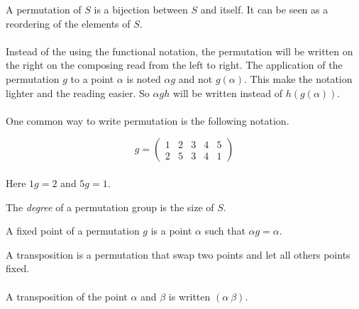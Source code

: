 \begin{definition}[Permutation]
  A permutation of $S$ is a bijection between $S$ and itself. It can be seen as a reordering of the elements of $S$.
\end{definition}

\paragraph{}
Instead of the using the functional notation, the permutation will be written on the right on the composing read from the left to right. The application of the permutation $g$ to a point $\alpha$ is noted $\alpha g$ and not $g(\alpha)$. This make the notation lighter and the reading easier. So $\alpha gh$ will be written instead of $h(g(\alpha))$.

\paragraph{}
One common way to write permutation is the following notation.

\[
  g =
  \left(
    \begin{array}{ccccc}
      1 & 2 & 3 & 4 & 5\\
      2 & 5 & 3 & 4 & 1
    \end{array}
  \right)
\]

\paragraph{}
Here $1g = 2$ and $5g = 1$.

\begin{definition}
  The \textit{degree} of a permutation group is the size of $S$.
\end{definition}

\begin{definition}
  A fixed point of a permutation $g$ is a point $\alpha$ such that $\alpha g = \alpha$.
\end{definition}

\begin{definition}[Transposition]
  A transposition is a permutation that swap two points and let all others points fixed.
\end{definition}

\paragraph{}
A transposition of the point $\alpha$ and $\beta$ is written $(\alpha\ \beta)$.

